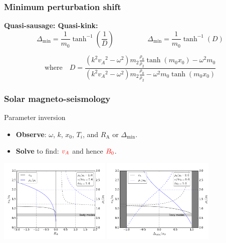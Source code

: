 \documentclass{beamer}
\begin{document}
\begin{frame}
\frametitle{Minimum perturbation shift}

\begin{block}{\textbf{Quasi-sausage: \hspace{3cm} Quasi-kink:}}
\vspace{-0.3cm}
\begin{equation*}
\Delta_\mathrm{min} = \frac{1}{m_0}\tanh^{-1}\left( \frac{1}{D} \right)
\hspace{2cm}
\Delta_\mathrm{min} = \frac{1}{m_0}\tanh^{-1}(D)
\end{equation*}
\end{block}

\begin{equation*}
\text{where} \quad
D = \frac{(k^2{v_A}^2-\omega^2)m_2\frac{\rho_0}{\rho_2}\tanh({m_0}x_0) - \omega^2{m_0}}{(k^2{v_A}^2-\omega^2)m_2\frac{\rho_0}{\rho_2} - \omega^2{m_0}\tanh({m_0}x_0)}
\end{equation*}

\end{frame}


\begin{frame}
\frametitle{Solar magneto-seismology}
\begin{block}{Parameter inversion}
\begin{itemize}
\item \textbf{Observe}: $\omega$, $k$, $x_0$, $T_i$, and $R_\mathrm{A}$ or $\Delta_\mathrm{min}$.
\item \textbf{Solve} to find: $\textcolor{red}{v_A}$ and hence $\textcolor{red}{B_0}$.
\end{itemize}
\end{block}
\vspace*{0.1in}
\centering
\includegraphics[height=4cm]{media/RA_vA_approx_2var.png}
\includegraphics[height=4cm]{media/DM_vA_approx_2var.png}
\end{frame}
\end{document}
